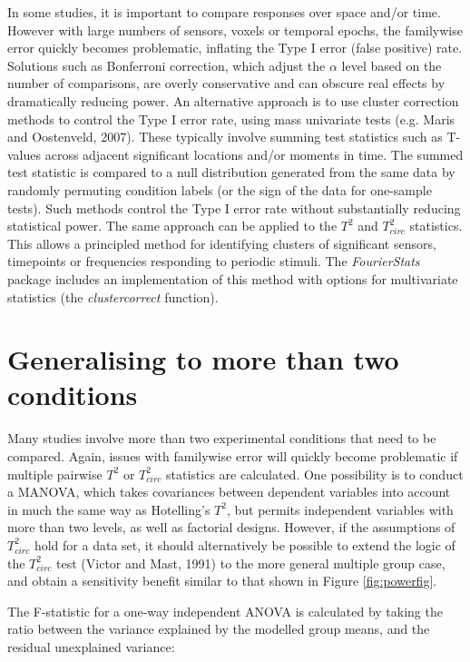 \documentclass[]{article}
\begin{document}
In some studies, it is important to compare responses over space and/or time. However with large numbers of sensors, voxels or temporal epochs, the familywise error quickly becomes problematic, inflating the Type I error (false positive) rate. Solutions such as Bonferroni correction, which adjust the \(\alpha\) level based on the number of comparisons, are overly conservative and can obscure real effects by dramatically reducing power. An alternative approach is to use cluster correction methods to control the Type I error rate, using mass univariate tests (e.g. Maris and Oostenveld, 2007). These typically involve summing test statistics such as T-values across adjacent significant locations and/or moments in time. The summed test statistic is compared to a null distribution generated from the same data by randomly permuting condition labels (or the sign of the data for one-sample tests). Such methods control the Type I error rate without substantially reducing statistical power. The same approach can be applied to the \(T^2\) and \(T^2_{circ}\) statistics. This allows a principled method for identifying clusters of significant sensors, timepoints or frequencies responding to periodic stimuli. The \emph{FourierStats} package includes an implementation of this method with options for multivariate statistics (the \emph{clustercorrect} function).

\hypertarget{generalising-to-more-than-two-conditions}{%
\section{Generalising to more than two conditions}\label{generalising-to-more-than-two-conditions}}

Many studies involve more than two experimental conditions that need to be compared. Again, issues with familywise error will quickly become problematic if multiple pairwise \(T^2\) or \(T^2_{circ}\) statistics are calculated. One possibility is to conduct a MANOVA, which takes covariances between dependent variables into account in much the same way as Hotelling's \(T^2\), but permits independent variables with more than two levels, as well as factorial designs. However, if the assumptions of \(T^2_{circ}\) hold for a data set, it should alternatively be possible to extend the logic of the \(T^2_{circ}\) test (Victor and Mast, 1991) to the more general multiple group case, and obtain a sensitivity benefit similar to that shown in Figure \ref{fig:powerfig}.

The F-statistic for a one-way independent ANOVA is calculated by taking the ratio between the variance explained by the modelled group means, and the residual unexplained variance:
\end{document}
